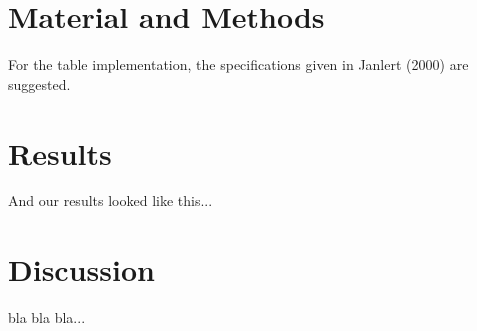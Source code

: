 \documentclass[a4paper,11pt,twoside]{article}
\begin{document}
 

\section{Material and Methods}
For the table implementation, the specifications given in Janlert (2000)
\cite[p 124]{janlert2001} are suggested. 

\section{Results}
And our results looked like this...

\section{Discussion}

bla bla bla... 


\end{document}
